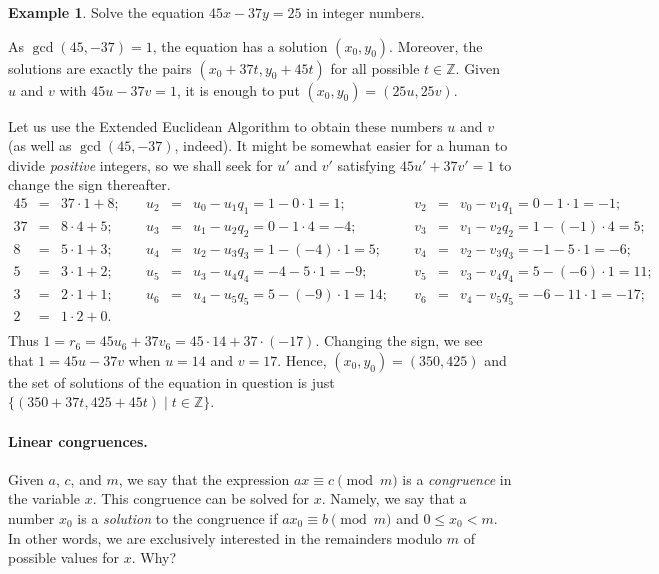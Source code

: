 \documentclass[12pt,notitlepage]{article}
\theoremstyle{plain}
\theoremstyle{definition}
\newtheorem{exm}[thm]{Example}
\theoremstyle{plain}
\newcommand{\Z}{\mathbb{Z}}
\newcommand{\1}{\mathbf{1}}
\newcommand{\0}{\mathbf{0}}
\begin{document}
\begin{exm}
Solve the equation $45x - 37y = 25$ in integer numbers.

As $\gcd(45, -37) = 1$, the equation has a solution $(x_0, y_0)$. Moreover, the solutions are exactly the pairs $(x_0 + 37t, y_0 + 45t)$ for all possible $t \in \Z$. Given $u$ and $v$ with $45 u - 37 v = 1$, it is enough to put $(x_0, y_0) = (25 u, 25 v)$.

Let us use the Extended Euclidean Algorithm to obtain these numbers $u$ and $v$ (as well as $\gcd(45,-37)$, indeed). It might be somewhat easier for a human to divide \emph{positive} integers, so we shall seek for $u'$ and $v'$ satisfying $45 u' + 37 v' = 1$ to change the sign thereafter.
$$
\begin{array}{lcllcllcl}
45 &=& 37\cdot1 + 8;\quad& u_2 &=& u_0 - u_1 q_1 = 1 - 0\cdot 1 = 1;&\quad v_2 &=& v_0 - v_1 q_1 = 0 - 1\cdot  1 = -1;\\
37 &=& 8\cdot 4 + 5;\quad& u_3 &=& u_1 - u_2 q_2 = 0 - 1\cdot 4 = -4;&\quad v_3 &=& v_1 - v_2 q_2 = 1 - (-1)\cdot  4 = 5;\\
8 &=& 5\cdot 1 + 3;\quad& u_4 &=& u_2 - u_3 q_3 = 1 - (-4)\cdot 1 = 5;&\quad v_4 &=& v_2 - v_3 q_3 = -1 - 5\cdot  1 = -6;\\
5 &=& 3\cdot 1 + 2;\quad& u_5 &=& u_3 - u_4 q_4 = -4 - 5\cdot 1 = -9;&\quad v_5 &=& v_3 - v_4 q_4 = 5 - (-6)\cdot  1 = 11;\\
3 &=& 2\cdot 1 + 1;\quad& u_6 &=& u_4 - u_5 q_5 = 5 - (-9)\cdot 1 = 14;&\quad v_6 &=& v_4 - v_5 q_5 = -6 - 11\cdot  1 = -17;\\
2 &=& 1\cdot 2 + 0.&&&&&&\\
\end{array}
$$
Thus $1 = r_6 = 45 u_6 + 37 v_6 = 45 \cdot 14 + 37 \cdot (-17)$. Changing the sign, we see that $1 = 45 u - 37 v$ when $u = 14$ and $v = 17$. Hence, $(x_0, y_0) = (350, 425)$ and the set of solutions of the equation in question is just $\{ (350 + 37t, 425 + 45t) \mid t \in \Z \}$.
\end{exm}

\paragraph{Linear congruences.} Given $a$, $c$, and $m$, we say that the expression $a x \equiv c \pmod m$ is a \emph{congruence} in the variable $x$. This congruence can be solved for $x$. Namely, we say that a number $x_0$ is a \emph{solution} to the congruence if $a x_0 \equiv b \pmod m$ and $0 \leq x_0 < m$. In other words, we are exclusively interested in the remainders modulo $m$ of possible values for $x$. Why?
\end{document}

